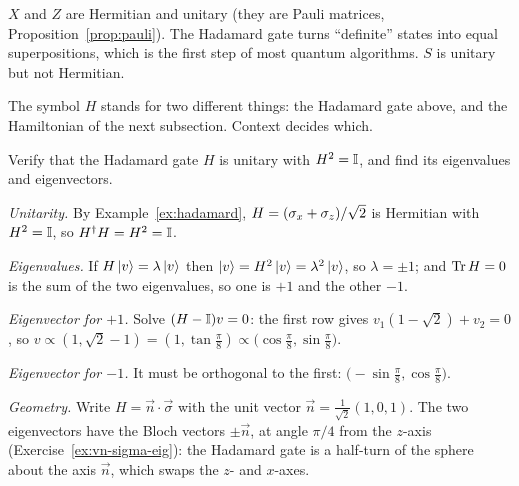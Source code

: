 $X$ and $Z$ are Hermitian and unitary (they are Pauli matrices, Proposition~\ref{prop:pauli}). The Hadamard gate turns ``definite'' states into equal superpositions, which is the first step of most quantum algorithms. $S$ is unitary but not Hermitian.

\begin{pitfall}
  The symbol $H$ stands for two different things: the Hadamard gate above, and the Hamiltonian of the next subsection. Context decides which.
\end{pitfall}

\begin{example}\label{ex:hadamard-eig}
  Verify that the Hadamard gate $H$ is unitary with $H^2=\mathbb{I}$, and find its eigenvalues and eigenvectors.
\end{example}
\begin{solution}
  \begin{steps}
    \item \emph{Unitarity.} By Example~\ref{ex:hadamard}, $H=(\sigma_x+\sigma_z)/\sqrt2$ is Hermitian with $H^2=\mathbb{I}$, so $H^\dagger H=H^2=\mathbb{I}$.
    \item \emph{Eigenvalues.} If $H\left|v\right\rangle=\lambda\left|v\right\rangle$ then $\left|v\right\rangle=H^2\left|v\right\rangle=\lambda^2\left|v\right\rangle$, so $\lambda=\pm1$; and $\operatorname{Tr} H=0$ is the sum of the two eigenvalues, so one is $+1$ and the other $-1$.
    \item \emph{Eigenvector for $+1$.} Solve $(H-\mathbb{I})v=0$: the first row gives $v_1(1-\sqrt2)+v_2=0$, so $v\propto(1,\sqrt2-1)=(1,\tan\frac\pi8)\propto\bigl(\cos\tfrac\pi8,\sin\tfrac\pi8\bigr)$.
    \item \emph{Eigenvector for $-1$.} It must be orthogonal to the first: $\bigl(-\sin\tfrac\pi8,\cos\tfrac\pi8\bigr)$.
    \item \emph{Geometry.} Write $H=\vec n\cdot\vec\sigma$ with the unit vector $\vec n=\frac1{\sqrt2}(1,0,1)$. The two eigenvectors have the Bloch vectors $\pm\vec n$, at angle $\pi/4$ from the $z$-axis (Exercise~\ref{ex:vn-sigma-eig}): the Hadamard gate is a half-turn of the sphere about the axis $\vec n$, which swaps the $z$- and $x$-axes.
  \end{steps}
\end{solution}


